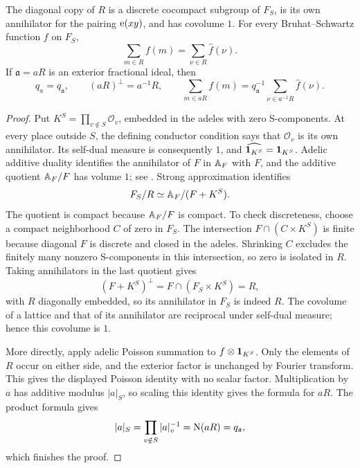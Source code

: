 \begin{lemma}\label{lem:s-lattice}
The diagonal copy of \(R\) is a discrete cocompact subgroup of \(F_S\), is
its own annihilator for the pairing \(\mathrm{e}(xy)\), and has covolume \(1\).
For every Bruhat--Schwartz function \(f\) on \(F_S\),
\[
 \sum_{m\in R}f(m)=\sum_{\nu\in R}\widehat f(\nu).
\]
If \(\mathfrak a=aR\) is an exterior fractional ideal, then
\[
 q_a=q_{\mathfrak a},\qquad
 (aR)^\perp=a^{-1}R,\qquad
 \sum_{m\in aR}f(m)
   =q_{\mathfrak a}^{-1}\sum_{\nu\in a^{-1}R}\widehat f(\nu).
\]
\end{lemma}

\begin{proof}
Put \(K^S=\prod_{v\notin S}\mathcal O_v\), embedded in the adeles with zero
S-components.  At every place outside \(S\),
the defining conductor condition says that \(\mathcal O_v\) is its own
annihilator.  Its self-dual measure is consequently \(1\), and
\(\widehat{\mathbf{1}_{K^S}}=\mathbf{1}_{K^S}\).  Adelic additive duality identifies the
annihilator of \(F\) in \(\mathbb{A}_F\) with \(F\), and the additive quotient
\(\mathbb{A}_F/F\) has volume \(1\); see
\cite[Chapter~II, \S29]{Weil64}.  Strong approximation identifies
\[
 F_S/R\simeq \mathbb{A}_F/(F+K^S).
\]
The quotient is compact because \(\mathbb{A}_F/F\) is compact.  To check
discreteness, choose a compact neighborhood \(C\) of zero in \(F_S\).
The intersection \(F\cap(C\times K^S)\) is finite because diagonal \(F\)
is discrete and closed in the adeles.  Shrinking \(C\) excludes the finitely
many nonzero S-components in this intersection, so zero is isolated in
\(R\).  Taking annihilators in the last quotient gives
\[
 (F+K^S)^\perp=F\cap(F_S\times K^S)=R,
\]
with \(R\) diagonally embedded, so its annihilator in \(F_S\) is indeed \(R\).
The covolume of a lattice and that of its annihilator are reciprocal under
self-dual measure; hence this covolume is \(1\).

More directly, apply adelic Poisson summation
\cite[Chapter~III, \S41, equation~(39)]{Weil64} to
\(f\otimes\mathbf{1}_{K^S}\).  Only the elements of \(R\) occur on either side,
and the exterior factor is unchanged by Fourier transform.  This gives the
displayed Poisson identity with no scalar factor.  Multiplication by \(a\)
has additive modulus \(|a|_S\), so scaling this identity gives the formula
for \(aR\).  The product formula gives
\[
 |a|_S=\prod_{v\notin S}|a|_v^{-1}
      =\mathrm{N}(aR)=q_{\mathfrak a},
\]
which finishes the proof.
\end{proof}

